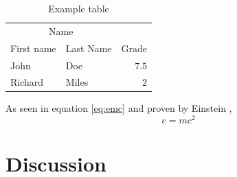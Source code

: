 \documentclass[12pt]{article}
\begin{document}
\begin{table}[h]
\caption{Example table}
\centering
\begin{tabular}{llr}
\multicolumn{2}{c}{Name} \\
First name & Last Name & Grade \\
John & Doe & $7.5$ \\
Richard & Miles & $2$ \\
\end{tabular}
\end{table}

\lipsum[5] %

As seen in equation \ref{eq:emc} and proven by Einstein \cite{einstein1935can},
\begin{equation}
\label{eq:emc}
e = mc^2
\end{equation}

\lipsum[6] %


\section*{Discussion}

\lipsum[7-8] %

\vspace{4\baselineskip}\vspace{-\parskip} %
\footnotesize %


\end{document}
